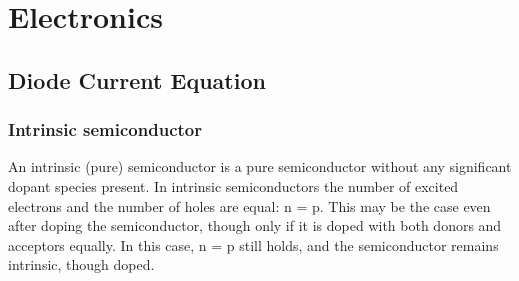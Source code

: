 \documentclass[12pt]{article}
\begin{document}
\section{Electronics}
\subsection{Diode Current Equation}
\subsubsection*{Intrinsic semiconductor}
An intrinsic (pure) semiconductor is a pure semiconductor without any significant dopant species present. In intrinsic semiconductors the number of excited electrons and the number of holes are equal: n = p. This may be the case even after doping the semiconductor, though only if it is doped with both donors and acceptors equally. In this case, n = p still holds, and the semiconductor remains intrinsic, though doped.
\end{document}
